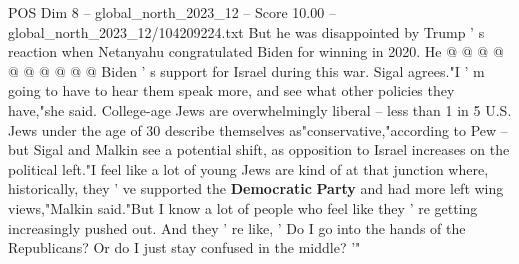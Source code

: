 \begin{textsample}{POS Dim 8 – global\_north\_2023\_12 – Score 10.00 – global\_north\_2023\_12/104209224.txt}
But he was disappointed by Trump ' s reaction when Netanyahu congratulated Biden for winning in 2020.
He @ @ @ @ @ @ @ @ @ @ Biden ' s support for Israel during this war.
Sigal agrees."I ' m going to have to hear them speak more, and see what other policies they have,"she said.
College-age Jews are overwhelmingly liberal -- less than 1 in 5 U.S.
Jews under the age of 30 describe themselves as"conservative,"according to Pew -- but Sigal and Malkin see a potential shift, as opposition to Israel increases on the political left."I feel like a lot of young Jews are kind of at that junction where, historically, they ' ve supported the \textbf{Democratic} \textbf{Party} and had more left wing views,"Malkin said."But I know a lot of people who feel like they ' re getting increasingly pushed out.
And they ' re like, ' Do I go into the hands of the Republicans?
Or do I just stay confused in the middle? '"

\end{textsample}

